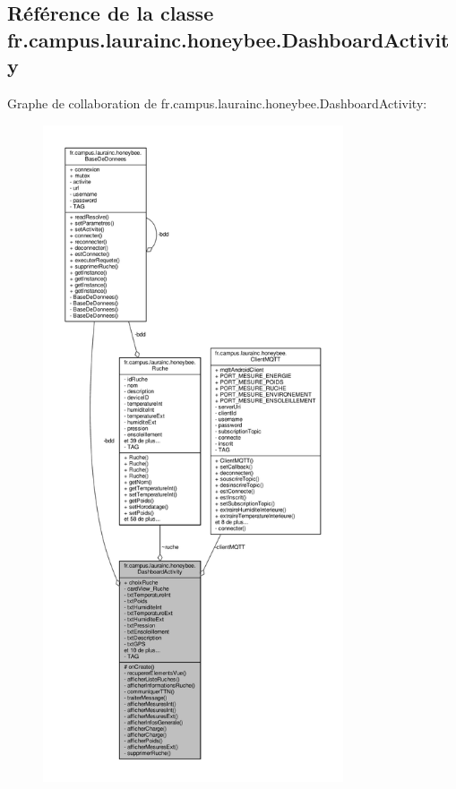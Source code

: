 \hypertarget{classfr_1_1campus_1_1laurainc_1_1honeybee_1_1_dashboard_activity}{}\subsection{Référence de la classe fr.\+campus.\+laurainc.\+honeybee.\+Dashboard\+Activity}
\label{classfr_1_1campus_1_1laurainc_1_1honeybee_1_1_dashboard_activity}


Graphe de collaboration de fr.\+campus.\+laurainc.\+honeybee.\+Dashboard\+Activity\+:\nopagebreak
\begin{figure}[H]
\begin{center}
\leavevmode
\includegraphics[height=550pt]{classfr_1_1campus_1_1laurainc_1_1honeybee_1_1_dashboard_activity__coll__graph}
\end{center}
\end{figure}
